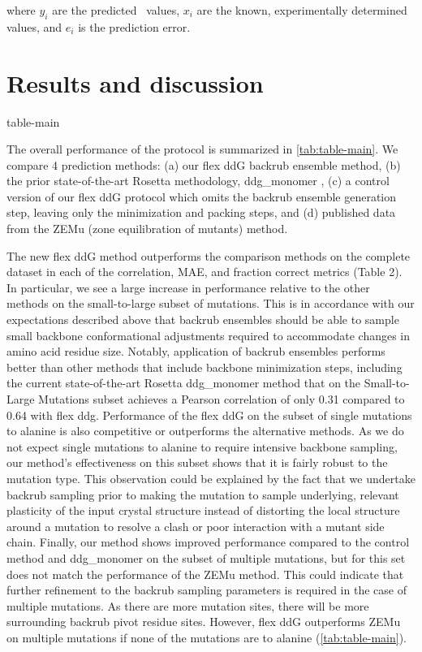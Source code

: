 where $y_i$ are the predicted \ddg\ values, $x_i$ are the known, experimentally determined values, and $e_i$ is the prediction error.

\section{Results and discussion}

{table-main}

The overall performance of the protocol is summarized in \cref{tab:table-main}.
We compare 4 prediction methods: (a) our flex ddG backrub ensemble method, (b) the prior state-of-the-art Rosetta methodology, ddg\_monomer \cite{kellogg_role_2011}, (c) a control version of our flex ddG protocol which omits the backrub ensemble generation step, leaving only the minimization and packing steps, and (d) published data from the ZEMu (zone equilibration of mutants) method\cite{dourado_multiscale_2014}.

The new flex ddG method outperforms the comparison methods on the complete dataset in each of the correlation, MAE, and fraction correct metrics (Table 2). In particular, we see a large increase in performance relative to the other methods on the small-to-large subset of mutations. This is in accordance with our expectations described above that backrub ensembles should be able to sample small backbone conformational adjustments required to accommodate changes in amino acid residue size. Notably, application of backrub ensembles performs better than other methods that include backbone minimization steps, including the current state-of-the-art Rosetta ddg\_monomer method that on the Small-to-Large Mutations subset achieves a Pearson correlation of only 0.31 compared to 0.64 with flex ddg.
Performance of the flex ddG on the subset of single mutations to alanine is also competitive or outperforms the alternative methods.
As we do not expect single mutations to alanine to require intensive backbone sampling, our method's effectiveness on this subset shows that it is fairly robust to the mutation type.
This observation could be explained by the fact that we undertake backrub sampling prior to making the mutation to sample underlying, relevant plasticity of the input crystal structure instead of distorting the local structure around a mutation to resolve a clash or poor interaction with a mutant side chain.
Finally, our method shows improved performance compared to the control method and ddg\_monomer on the subset of multiple mutations, but for this set does not match the performance of the ZEMu method.
This could indicate that further refinement to the backrub sampling parameters is required in the case of multiple mutations.
As there are more mutation sites, there will be more surrounding backrub pivot residue sites.
However, flex ddG outperforms ZEMu on multiple mutations if none of the mutations are to alanine (\cref{tab:table-main}).

